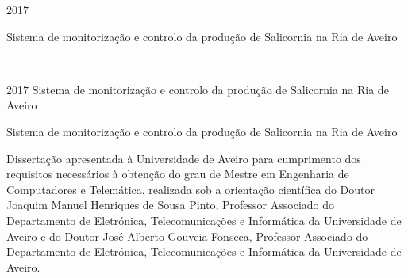 \documentclass[11pt,twoside,a4paper]{report}
\def\ThesisYear{2017}
\newcommand{\namethesispt}{Sistema de monitorização e controlo da produção de Salicornia na Ria de Aveiro}
\newcommand{\namethesisen}{}
\begin{document}
%
%

\TitlePage
         {\ThesisYear}
        {\namethesispt
        \newline \newline
       	\namethesisen
    	}
\EndTitlePage
\titlepage\ \endtitlepage %

\TitlePage
  \HEADER{\BAR\FIG{\begin{minipage}{50mm} %
          \end{minipage}}}
         {\ThesisYear}
{\namethesispt
\newline \newline
\namethesisen}
\EndTitlePage
\titlepage\ \endtitlepage %


%
%

\TitlePage
  \HEADERSEM{}{\ThesisYear}
  {\namethesispt
  	\newline \newline
  	\namethesisen
  }
  \vspace*{15mm}
  \TEXT{}
       {Dissertação apresentada à Universidade de Aveiro para cumprimento dos requisitos necessários à obtenção do grau de Mestre em Engenharia de Computadores e Telemática, realizada sob a orientação científica do Doutor Joaquim Manuel Henriques de Sousa Pinto, Professor Associado do Departamento de Eletrónica, Telecomunicações e Informática da Universidade de Aveiro e do Doutor José Alberto Gouveia Fonseca, Professor Associado do Departamento de Eletrónica, Telecomunicações e Informática da Universidade de Aveiro. }
\EndTitlePage
\titlepage\ \endtitlepage %
\end{document}
